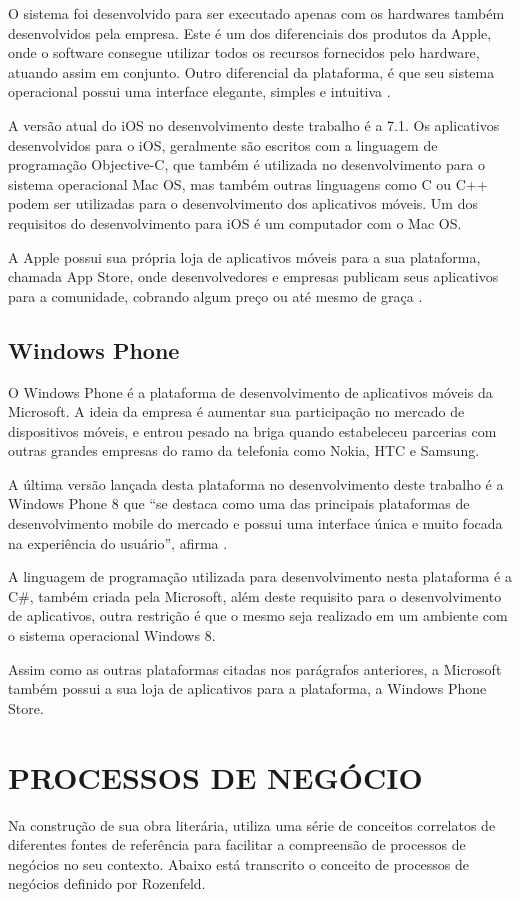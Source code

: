 \documentclass[
	12pt,				%
	openright,			%
	oneside,			%
	a4paper,			%
	chapter=TITLE,		%
	section=TITLE,		%
	english,			%
	french,				%
	spanish,			%
	brazil				%
	]{abntex2}
\begin{document}
O sistema foi desenvolvido para ser executado apenas com os hardwares também desenvolvidos pela empresa. Este é um dos diferenciais dos produtos da Apple, onde o software consegue utilizar todos os recursos fornecidos pelo hardware, atuando assim em conjunto. Outro diferencial da plataforma, é que seu sistema operacional possui uma interface elegante, simples e intuitiva \cite{milaniIOS}. 

A versão atual do iOS no desenvolvimento deste trabalho é a 7.1. Os aplicativos desenvolvidos para o iOS, geralmente são escritos com a linguagem de programação Objective-C, que também é utilizada no desenvolvimento para o sistema operacional Mac OS, mas também outras linguagens como C ou C++ podem ser utilizadas para o desenvolvimento dos aplicativos móveis. Um dos requisitos do desenvolvimento para iOS é um computador com o Mac OS. 

A Apple possui sua própria loja de aplicativos móveis para a sua plataforma, chamada App Store, onde desenvolvedores e empresas publicam seus aplicativos para a comunidade, cobrando algum preço ou até mesmo de graça \cite{pilonesIOS}.

\subsection{Windows Phone}
O Windows Phone é a plataforma de desenvolvimento de aplicativos móveis da Microsoft. A ideia da empresa é aumentar sua participação no mercado de dispositivos móveis, e entrou pesado na briga quando estabeleceu parcerias com outras grandes empresas do ramo da telefonia como Nokia, HTC e Samsung. 

A última versão lançada desta plataforma no desenvolvimento deste trabalho é a Windows Phone 8 que “se destaca como uma das principais plataformas de desenvolvimento mobile do mercado e possui uma interface única e muito focada na experiência do usuário”, afirma . 

A linguagem de programação utilizada para desenvolvimento nesta plataforma é a C\#, também criada pela Microsoft, além deste requisito para o desenvolvimento de aplicativos, outra restrição é que o mesmo seja realizado em um ambiente com o sistema operacional Windows 8. 

Assim como as outras plataformas citadas nos parágrafos anteriores, a Microsoft também possui a sua loja de aplicativos para a plataforma, a Windows Phone Store.

\section{PROCESSOS DE NEGÓCIO}
Na construção de sua obra literária,  utiliza uma série de conceitos correlatos de diferentes fontes de referência para facilitar a compreensão de processos de negócios no seu contexto. Abaixo está transcrito o conceito de processos de negócios definido por Rozenfeld.
\end{document}

